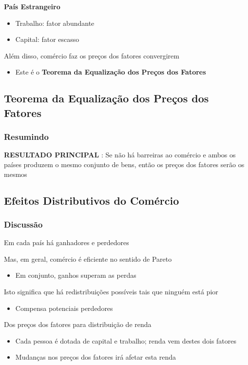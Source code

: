 \documentclass[a4paper,12pt]{article}[abntex2]
\begin{document}
\textbf{País Estrangeiro}
\begin{itemize}
    \item Trabalho: fator abundante
    \item Capital: fator escasso
\end{itemize}

Além disso, comércio faz os preços dos fatores convergirem
\begin{itemize}
    \item Este é o \textbf{Teorema da Equalização dos Preços dos Fatores}
\end{itemize}


\subsection{\textbf{Teorema da Equalização dos Preços dos Fatores}}
\subsubsection{\textbf{Resumindo}}
\textbf{RESULTADO PRINCIPAL} : Se não há barreiras ao comércio e ambos os países produzem o mesmo conjunto de bens, então os preços dos fatores serão os mesmos

\subsection{\textbf{Efeitos Distributivos do Comércio}}
\subsubsection{\textbf{Discussão}}
Em cada país há ganhadores e perdedores

Mas, em geral, comércio é eficiente no sentido de Pareto
\begin{itemize}
    \item Em conjunto, ganhos superam as perdas
\end{itemize}

Isto significa que há redistribuições possíveis tais que ninguém está pior
\begin{itemize}
    \item Compensa potenciais perdedores
\end{itemize}

Dos preços dos fatores para distribuição de renda
\begin{itemize}
    \item Cada pessoa é dotada de capital e trabalho; renda vem destes dois fatores
    \item Mudanças nos preços dos fatores irá afetar esta renda
\end{itemize}
\end{document}
